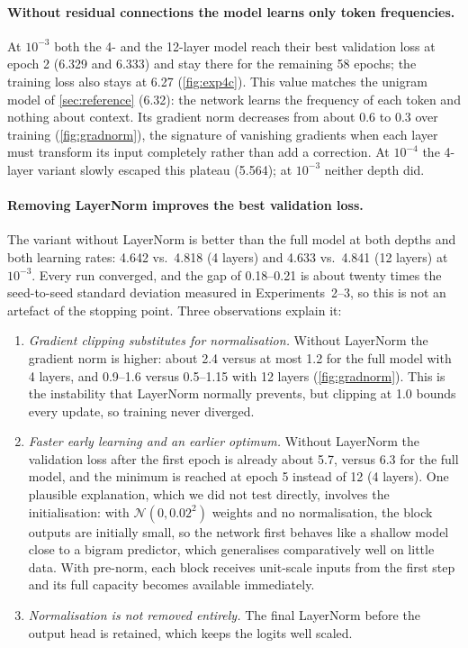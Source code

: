 \documentclass[11pt,a4paper]{article}
\begin{document}
\paragraph{Without residual connections the model learns only token frequencies.} At $10^{-3}$ both the 4- and the 12-layer model reach their best validation loss at epoch 2 (6.329 and 6.333) and stay there for the remaining 58 epochs; the training loss also stays at 6.27 (\cref{fig:exp4c}). This value matches the unigram model of \cref{sec:reference} (6.32): the network learns the frequency of each token and nothing about context. Its gradient norm decreases from about 0.6 to 0.3 over training (\cref{fig:gradnorm}), the signature of vanishing gradients when each layer must transform its input completely rather than add a correction. At $10^{-4}$ the 4-layer variant slowly escaped this plateau (5.564); at $10^{-3}$ neither depth did.

\paragraph{Removing LayerNorm improves the best validation loss.} The variant without LayerNorm is better than the full model at both depths and both learning rates: 4.642 vs.\ 4.818 (4 layers) and 4.633 vs.\ 4.841 (12 layers) at $10^{-3}$. Every run converged, and the gap of 0.18--0.21 is about twenty times the seed-to-seed standard deviation measured in Experiments~2--3, so this is not an artefact of the stopping point. Three observations explain it:
\begin{enumerate}[leftmargin=*]
  \item \emph{Gradient clipping substitutes for normalisation.} Without LayerNorm the gradient norm is higher: about 2.4 versus at most 1.2 for the full model with 4 layers, and 0.9--1.6 versus 0.5--1.15 with 12 layers (\cref{fig:gradnorm}). This is the instability that LayerNorm normally prevents, but clipping at 1.0 bounds every update, so training never diverged.
  \item \emph{Faster early learning and an earlier optimum.} Without LayerNorm the validation loss after the first epoch is already about 5.7, versus 6.3 for the full model, and the minimum is reached at epoch 5 instead of 12 (4 layers). One plausible explanation, which we did not test directly, involves the initialisation: with $\mathcal{N}(0,0.02^2)$ weights and no normalisation, the block outputs are initially small, so the network first behaves like a shallow model close to a bigram predictor, which generalises comparatively well on little data. With pre-norm, each block receives unit-scale inputs from the first step and its full capacity becomes available immediately.
  \item \emph{Normalisation is not removed entirely.} The final LayerNorm before the output head is retained, which keeps the logits well scaled.
\end{enumerate}
\end{document}

